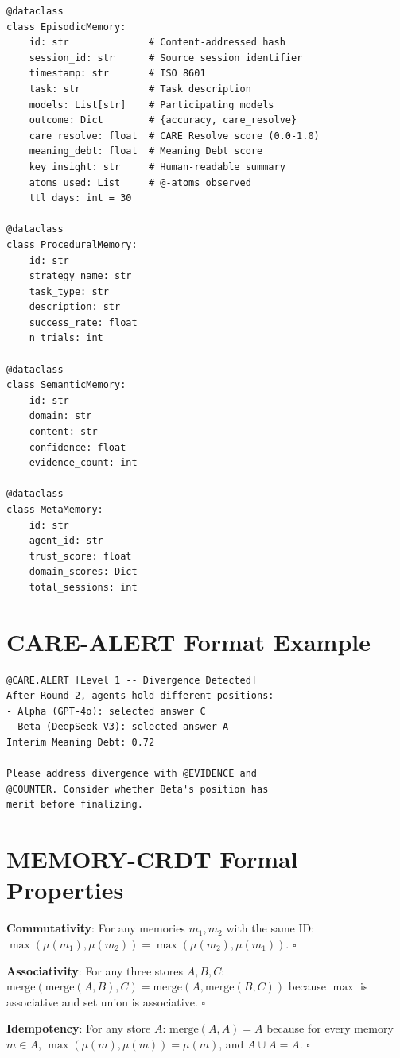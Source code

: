 \documentclass[11pt,a4paper]{article}
\begin{document}
\begin{lstlisting}[caption={Memory dataclass definitions.}]
@dataclass
class EpisodicMemory:
    id: str              # Content-addressed hash
    session_id: str      # Source session identifier
    timestamp: str       # ISO 8601
    task: str            # Task description
    models: List[str]    # Participating models
    outcome: Dict        # {accuracy, care_resolve}
    care_resolve: float  # CARE Resolve score (0.0-1.0)
    meaning_debt: float  # Meaning Debt score
    key_insight: str     # Human-readable summary
    atoms_used: List     # @-atoms observed
    ttl_days: int = 30

@dataclass
class ProceduralMemory:
    id: str
    strategy_name: str
    task_type: str
    description: str
    success_rate: float
    n_trials: int

@dataclass
class SemanticMemory:
    id: str
    domain: str
    content: str
    confidence: float
    evidence_count: int

@dataclass
class MetaMemory:
    id: str
    agent_id: str
    trust_score: float
    domain_scores: Dict
    total_sessions: int
\end{lstlisting}

\section{CARE-ALERT Format Example}

\begin{lstlisting}[language={},caption={Example CARE-ALERT injection.}]
@CARE.ALERT [Level 1 -- Divergence Detected]
After Round 2, agents hold different positions:
- Alpha (GPT-4o): selected answer C
- Beta (DeepSeek-V3): selected answer A
Interim Meaning Debt: 0.72

Please address divergence with @EVIDENCE and
@COUNTER. Consider whether Beta's position has
merit before finalizing.
\end{lstlisting}

\section{MEMORY-CRDT Formal Properties}

\textbf{Commutativity}: For any memories $m_1, m_2$ with the same ID:
$\max(\mu(m_1), \mu(m_2)) = \max(\mu(m_2), \mu(m_1))$. \hfill$\square$

\textbf{Associativity}: For any three stores $A, B, C$:
$\text{merge}(\text{merge}(A,B), C) = \text{merge}(A, \text{merge}(B,C))$
because $\max$ is associative and set union is associative. \hfill$\square$

\textbf{Idempotency}: For any store $A$:
$\text{merge}(A, A) = A$ because for every memory $m \in A$,
$\max(\mu(m), \mu(m)) = \mu(m)$, and $A \cup A = A$. \hfill$\square$
\end{document}

